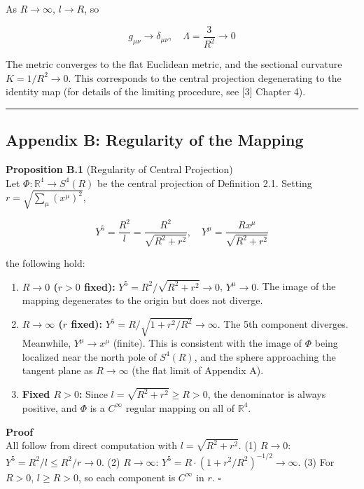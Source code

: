 \documentclass[a4paper,11pt]{article}
\theoremstyle{definition}
\begin{document}
As \(R \to \infty\), \(l \to R\), so

\[g_{\mu\nu} \to \delta_{\mu\nu}, \quad \Lambda = \frac{3}{R^2} \to 0\]

The metric converges to the flat Euclidean metric, and the sectional curvature \(K = 1/R^2 \to 0\). This corresponds to the central projection degenerating to the identity map (for details of the limiting procedure, see {[}3{]} Chapter 4).

\begin{center}\rule{0.5\linewidth}{0.5pt}\end{center}

\subsection{Appendix B: Regularity of the Mapping}\label{appendix-b-regularity-of-the-mapping}

\textbf{Proposition B.1} (Regularity of Central Projection)\\
Let \(\Phi: \mathbb{R}^4 \to S^4(R)\) be the central projection of Definition 2.1. Setting \(r = \sqrt{\sum_\mu (x^\mu)^2}\),

\[Y^5 = \frac{R^2}{l} = \frac{R^2}{\sqrt{R^2 + r^2}}, \quad Y^\mu = \frac{Rx^\mu}{\sqrt{R^2+r^2}}\]

the following hold:

\begin{enumerate}
\def\labelenumi{\arabic{enumi}.}
\item
  \textbf{\(R \to 0\) (\(r > 0\) fixed):} \(Y^5 = R^2/\sqrt{R^2+r^2} \to 0\), \(Y^\mu \to 0\). The image of the mapping degenerates to the origin but does not diverge.
\item
  \textbf{\(R \to \infty\) (\(r\) fixed):} \(Y^5 = R/\sqrt{1+r^2/R^2} \to \infty\). The 5th component diverges. Meanwhile, \(Y^\mu \to x^\mu\) (finite). This is consistent with the image of \(\Phi\) being localized near the north pole of \(S^4(R)\), and the sphere approaching the tangent plane as \(R \to \infty\) (the flat limit of Appendix A).
\item
  \textbf{Fixed \(R > 0\):} Since \(l = \sqrt{R^2+r^2} \geq R > 0\), the denominator is always positive, and \(\Phi\) is a \(C^\infty\) regular mapping on all of \(\mathbb{R}^4\).
\end{enumerate}

\textbf{Proof}\\
All follow from direct computation with \(l = \sqrt{R^2+r^2}\). (1) \(R\to 0\): \(Y^5 = R^2/l \leq R^2/r \to 0\). (2) \(R\to\infty\): \(Y^5 = R\cdot(1+r^2/R^2)^{-1/2} \to \infty\). (3) For \(R>0\), \(l \geq R > 0\), so each component is \(C^\infty\) in \(r\). \(\square\)
\end{document}
